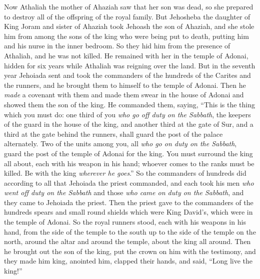 \begin{biblechapter} %
 Now Athaliah the mother of Ahaziah saw that her son was dead, so she prepared to destroy all of the offspring of the royal family.
\verse But Jehosheba the daughter of King Joram and sister of Ahaziah took Jehoash the son of Ahaziah, and she stole him from among the sons of the king who were being put to death, putting him and his nurse in the inner bedroom. So they hid him from the presence of Athaliah, and he was not killed.
\verse He remained with her in the temple of Adonai, hidden for six years while Athaliah was reigning over the land.
\verse But in the seventh year Jehoiada sent and took the commanders of the hundreds of the Carites and the runners, and he brought them to himself to the temple of Adonai. Then he \textit{made} a covenant with them and made them swear in the house of Adonai and showed them the son of the king.
\verse He commanded them, saying, “This is the thing which you must do: one third of you \textit{who go off duty on the Sabbath}, the keepers of the guard in the house of the king,
\verse and another third at the gate of Sur, and a third at the gate behind the runners, shall guard the post of the palace alternately.
\verse Two of the units among you, all \textit{who go on duty on the Sabbath}, guard the post of the temple of Adonai for the king.
\verse You must surround the king all about, each with his weapon in his hand; whoever comes to the ranks must be killed. Be with the king \textit{wherever he goes}.”
\verse So the commanders of hundreds did according to all that Jehoiada the priest commanded, and each took his men \textit{who went off duty on the Sabbath} and those \textit{who came on duty on the Sabbath}, and they came to Jehoiada the priest.
\verse Then the priest gave to the commanders of the hundreds spears and small round shields which were King David’s, which were in the temple of Adonai.
\verse So the royal runners stood, each with his weapons in his hand, from the side of the temple to the south up to the side of the temple on the north, around the altar and around the temple, about the king all around.
\verse Then he brought out the son of the king, put the crown on him with the testimony, and they made him king, anointed him, clapped their hands, and said, “Long live the king!”

\end{biblechapter}
